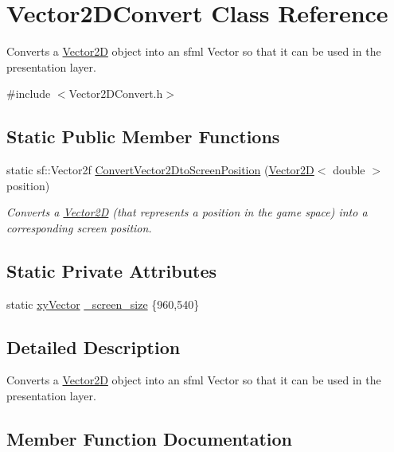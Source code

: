 \hypertarget{class_vector2_d_convert}{}\section{Vector2\+D\+Convert Class Reference}
\label{class_vector2_d_convert}


Converts a \hyperlink{class_vector2_d}{Vector2D} object into an sfml Vector so that it can be used in the presentation layer.  




{\ttfamily \#include $<$Vector2\+D\+Convert.\+h$>$}

\subsection*{Static Public Member Functions}
\begin{DoxyCompactItemize}
\item 
static sf\+::\+Vector2f \hyperlink{class_vector2_d_convert_aa4aff52a3a85d4b7da4123e7b73d2d24}{Convert\+Vector2\+Dto\+Screen\+Position} (\hyperlink{class_vector2_d}{Vector2D}$<$ double $>$ position)
\begin{DoxyCompactList}\small\item\em Converts a \hyperlink{class_vector2_d}{Vector2D} (that represents a position in the game space) into a corresponding screen position. \end{DoxyCompactList}\end{DoxyCompactItemize}
\subsection*{Static Private Attributes}
\begin{DoxyCompactItemize}
\item 
static \hyperlink{structxy_vector}{xy\+Vector} \hyperlink{class_vector2_d_convert_a6eef0a8081bf94301b98332ef362be2c}{\+\_\+screen\+\_\+size} \{960,540\}
\end{DoxyCompactItemize}


\subsection{Detailed Description}
Converts a \hyperlink{class_vector2_d}{Vector2D} object into an sfml Vector so that it can be used in the presentation layer. 

\subsection{Member Function Documentation}
\mbox{\label{class_vector2_d_convert_aa4aff52a3a85d4b7da4123e7b73d2d24}} 
